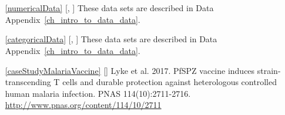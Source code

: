 





\section{}
\label{ch_summarizing_data_data}

\begin{itemize}
\item[\ref{numericalData}]
    [\datalink{loan50}, \datalink{county}]
    These data sets are described in
    Data Appendix~\ref{ch_intro_to_data_data}.

\item[\ref{categoricalData}]
    [\datalink{loan50}, \datalink{county}]
    These data sets are described in
    Data Appendix~\ref{ch_intro_to_data_data}.

\item[\ref{caseStudyMalariaVaccine}]
    [\datalink{malaria}]
    Lyke et al. 2017.
    PfSPZ vaccine induces strain-transcending T cells
    and durable protection against heterologous controlled
    human malaria infection.
    PNAS 114(10):2711-2716.
    \url{http://www.pnas.org/content/114/10/2711}
\end{itemize}









\section{}
\label{ch_probability_data}

